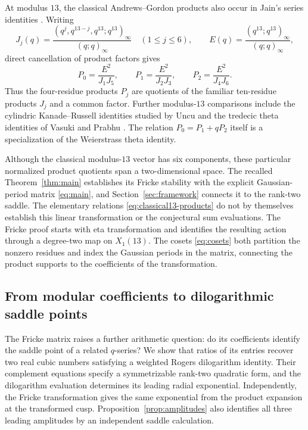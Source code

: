 \documentclass[11pt,reqno]{amsart}
\theoremstyle{remark}
\numberwithin{equation}{section}
\begin{document}
At modulus $13$, the classical Andrews--Gordon products \cite{Andrews}
also occur in Jain's series identities \cite[(3.15)--(3.20)]{Jain}.
Writing
\[
 J_j(q)=\frac{(q^j,q^{13-j},q^{13};q^{13})_\infty}{(q;q)_\infty}
 \quad(1\leq j\leq6),\qquad
 E(q)=\frac{(q^{13};q^{13})_\infty}{(q;q)_\infty},
\]
direct cancellation of product factors gives
\begin{equation}\label{eq:classical13-products}
 P_0=\frac{E^2}{J_1J_5},\qquad
 P_1=\frac{E^2}{J_2J_3},\qquad
 P_2=\frac{E^2}{J_4J_6}.
\end{equation}
Thus the four-residue products $P_j$ are quotients of the familiar
ten-residue products $J_j$ and a common factor. Further modulus-$13$
comparisons include the cylindric Kanade--Russell identities studied by
Uncu \cite{Uncu} and the tredecic theta identities of Vasuki and Prabhu
\cite{VasukiPrabhu}. The relation $P_0=P_1+qP_2$ itself is a specialization
of the Weierstrass theta identity.

Although the classical modulus-$13$ vector has six components, these
particular normalized product quotients span a two-dimensional space.
The recalled Theorem~\ref{thm:main} establishes its Fricke stability with the explicit
Gaussian-period matrix \eqref{eq:main}, and Section~\ref{sec:framework}
connects it to the rank-two saddle. The elementary relations
\eqref{eq:classical13-products} do not by themselves establish this linear
transformation or the conjectural sum evaluations. The Fricke proof starts
with eta transformation and identifies the resulting action through a
degree-two map on $X_1(13)$. The cosets \eqref{eq:cosets} both partition
the nonzero residues and index the Gaussian periods in the matrix,
connecting the product supports to the coefficients of the transformation.

\subsection{From modular coefficients to dilogarithmic saddle points}
The Fricke matrix raises a further arithmetic question: do its coefficients
identify the saddle point of a related $q$-series? We show that ratios of
its entries recover two real cubic numbers satisfying a weighted Rogers
dilogarithm identity. Their complement equations specify a symmetrizable
rank-two quadratic form, and the dilogarithm evaluation determines its
leading radial exponential. Independently, the Fricke transformation gives
the same exponential from the product expansion at the transformed cusp.
Proposition~\ref{prop:amplitudes} also identifies all three leading
amplitudes by an independent saddle calculation.
\end{document}
